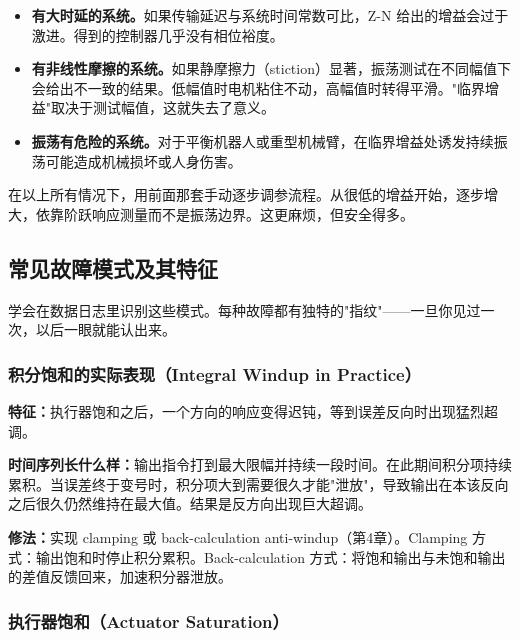 \begin{itemize}
    \item \textbf{有大时延的系统。}如果传输延迟与系统时间常数可比，Z-N 给出的增益会过于激进。得到的控制器几乎没有相位裕度。

    \item \textbf{有非线性摩擦的系统。}如果静摩擦力（stiction）显著，振荡测试在不同幅值下会给出不一致的结果。低幅值时电机粘住不动，高幅值时转得平滑。"临界增益"取决于测试幅值，这就失去了意义。

    \item \textbf{振荡有危险的系统。}对于平衡机器人或重型机械臂，在临界增益处诱发持续振荡可能造成机械损坏或人身伤害。
\end{itemize}

在以上所有情况下，用前面那套手动逐步调参流程。从很低的增益开始，逐步增大，依靠阶跃响应测量而不是振荡边界。这更麻烦，但安全得多。

\subsection{常见故障模式及其特征}

学会在数据日志里识别这些模式。每种故障都有独特的"指纹"——一旦你见过一次，以后一眼就能认出来。

\subsubsection{积分饱和的实际表现（Integral Windup in Practice）}

\textbf{特征：}执行器饱和之后，一个方向的响应变得迟钝，等到误差反向时出现猛烈超调。

\textbf{时间序列长什么样：}输出指令打到最大限幅并持续一段时间。在此期间积分项持续累积。当误差终于变号时，积分项大到需要很久才能"泄放"，导致输出在本该反向之后很久仍然维持在最大值。结果是反方向出现巨大超调。

\textbf{修法：}实现 clamping 或 back-calculation anti-windup（第4章）。Clamping 方式：输出饱和时停止积分累积。Back-calculation 方式：将饱和输出与未饱和输出的差值反馈回来，加速积分器泄放。

\subsubsection{执行器饱和（Actuator Saturation）}

